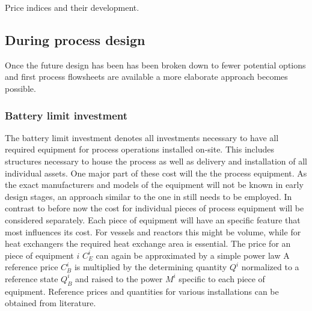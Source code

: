 \begin{table}
	\center
	
	\caption{Price indices and their development.}
	\label{tab:PriceIndices}
\end{table}

\subsection{During process design}
Once the future design has been has been broken down to fewer potential options and first process 
flowsheets are available a more elaborate approach becomes possible. 

\subsubsection{Battery limit investment} 
The battery limit investment denotes all investments necessary to have all required equipment 
for process operations installed on-site. This includes structures necessary to house the process as well as
delivery and installation of all individual assets.  One major part of these cost will the the process 
equipment. As the exact manufacturers and models of the equipment will not be known in early design 
stages, an approach similar to the one in  still needs to be employed. In contrast to 
before now the cost for individual pieces of process equipment will be considered separately.  
Each piece of equipment will have an specific feature that most influences its cost. For vessels and 
reactors this might be volume, while for heat exchangers the required heat exchange area is essential. 
The price for an piece of equipment  $i$ $C^{i}_E$ can again be approximated by a simple power law
%
A reference price $C^{i}_B$ is multiplied by the determining quantity $Q^{i}$ normalized to a reference state 
$Q^{i}_B$ and raised to the power $M^{i}$ specific to each piece of equipment. Reference prices and 
quantities for various installations can be obtained from literature. 

